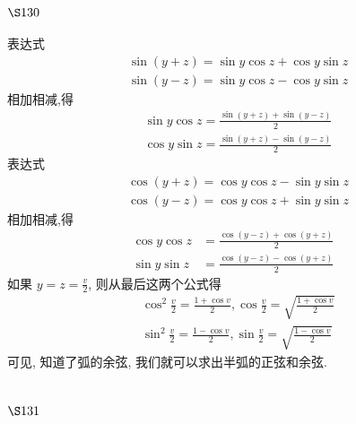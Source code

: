 \section{$\S 130$}

表达式
\[
\begin{aligned}
& \sin (y+z)=\sin y \cos z+\cos y \sin z \\
& \sin (y-z)=\sin y \cos z-\cos y \sin z
\end{aligned}
\]
相加相减,得
\[
\begin{aligned}
& \sin y \cos z=\frac{\sin (y+z)+\sin (y-z)}{2} \\
& \cos y \sin z=\frac{\sin (y+z)-\sin (y-z)}{2}
\end{aligned}
\]
表达式
\[
\begin{aligned}
& \cos (y+z)=\cos y \cos z-\sin y \sin z \\
& \cos (y-z)=\cos y \cos z+\sin y \sin z
\end{aligned}
\]
相加相减,得
\[
\begin{aligned}
\cos y \cos z & =\frac{\cos (y-z)+\cos (y+z)}{2} \\
\sin y \sin z & =\frac{\cos (y-z)-\cos (y+z)}{2}
\end{aligned}
\]
如果 $y=z=\frac{v}{2}$, 则从最后这两个公式得
\[
\begin{aligned}
& \cos ^{2} \frac{v}{2}=\frac{1+\cos v}{2}, \cos \frac{v}{2}=\sqrt{\frac{1+\cos v}{2}} \\
& \sin ^{2} \frac{v}{2}=\frac{1-\cos v}{2}, \sin \frac{v}{2}=\sqrt{\frac{1-\cos v}{2}}
\end{aligned}
\]
可见, 知道了弧的余弦, 我们就可以求出半弧的正弦和余弦.

\section{$\S 131$}

